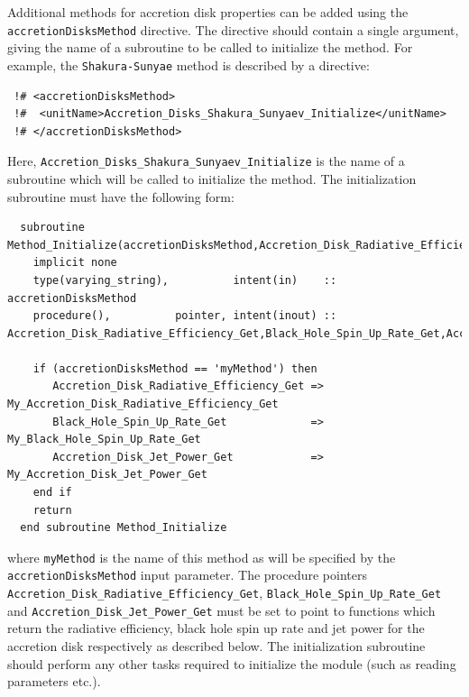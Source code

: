 Additional methods for accretion disk properties can be added using the {\tt accretionDisksMethod} directive. The directive should contain a single argument, giving the name of a subroutine to be called to initialize the method. For example, the {\tt Shakura-Sunyae} method is described by a directive:
\begin{verbatim}
 !# <accretionDisksMethod>
 !#  <unitName>Accretion_Disks_Shakura_Sunyaev_Initialize</unitName>
 !# </accretionDisksMethod>
\end{verbatim}
Here, {\tt Accretion\_Disks\_Shakura\_Sunyaev\_Initialize} is the name of a subroutine which will be called to initialize the method. The initialization subroutine must have the following form:
\begin{verbatim}
  subroutine Method_Initialize(accretionDisksMethod,Accretion_Disk_Radiative_Efficiency_Get,Black_Hole_Spin_Up_Rate_Get,Accretion_Disk_Jet_Power_Get)
    implicit none
    type(varying_string),          intent(in)    :: accretionDisksMethod
    procedure(),          pointer, intent(inout) :: Accretion_Disk_Radiative_Efficiency_Get,Black_Hole_Spin_Up_Rate_Get,Accretion_Disk_Jet_Power_Get
    
    if (accretionDisksMethod == 'myMethod') then
       Accretion_Disk_Radiative_Efficiency_Get => My_Accretion_Disk_Radiative_Efficiency_Get
       Black_Hole_Spin_Up_Rate_Get             => My_Black_Hole_Spin_Up_Rate_Get
       Accretion_Disk_Jet_Power_Get            => My_Accretion_Disk_Jet_Power_Get
    end if
    return
  end subroutine Method_Initialize
\end{verbatim}
where {\tt myMethod} is the name of this method as will be specified by the {\tt accretionDisksMethod} input parameter. The procedure pointers {\tt Accretion\_Disk\_Radiative\_Efficiency\_Get}, {\tt Black\_Hole\_Spin\_Up\_Rate\_Get} and {\tt Accretion\_Disk\_Jet\_Power\_Get} must be set to point to functions which return the radiative efficiency, black hole spin up rate and jet power for the accretion disk respectively as described below. The initialization subroutine should perform any other tasks required to initialize the module (such as reading parameters etc.).

